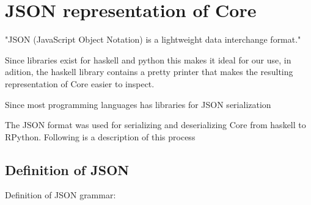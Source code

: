 
\section{JSON representation of Core}

"JSON (JavaScript Object Notation) is a lightweight data interchange format."

Since libraries exist for haskell and python this makes it ideal for our use,
in adition, the haskell library contains a pretty printer that makes the resulting
representation of Core easier to inspect.

Since most programming languages has libraries for JSON serialization

The JSON format was used for serializing and deserializing Core from haskell to RPython.
Following is a description of this process


\subsection{Definition of JSON}

Definition of JSON grammar:

